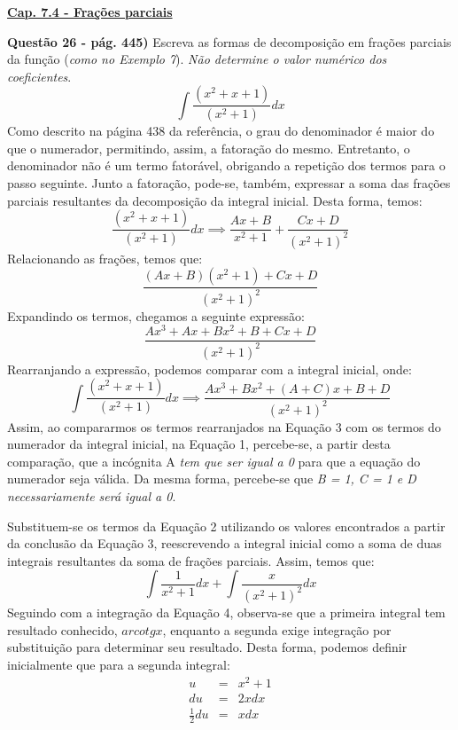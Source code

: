 \documentclass[12pt]{article}
\begin{document}
\noindent \underline{\textbf{Cap. 7.4 - Frações parciais}}\par
\noindent \textbf{Questão 26 - pág. 445)} Escreva as formas de decomposição em frações parciais da função (\textit{como no Exemplo 7}). \textit{Não determine o valor numérico dos coeficientes}.
\begin{equation}
    \int \frac{(x^2+x+1)}{(x^2+1)}dx \tag{1}
\end{equation}
Como descrito na página 438 da referência, o grau do denominador é maior do que o numerador, permitindo, assim, a fatoração do mesmo. Entretanto, o denominador não é um termo fatorável, obrigando a repetição dos termos para o passo seguinte. Junto a fatoração, pode-se, também, expressar a soma das frações parciais resultantes da decomposição da integral inicial. Desta forma, temos:
\begin{equation}
    \frac{(x^2+x+1)}{(x^2+1)}dx \implies \frac{Ax+B}{x^2+1} + \frac{Cx+D}{(x^2+1)^2}  \tag{2}
\end{equation}
Relacionando as frações, temos que:
\begin{equation}
    \frac{(Ax+B)(x^2+1)+Cx+D}{(x^2+1)^2} \nonumber
\end{equation}
Expandindo os termos, chegamos a seguinte expressão:
\begin{equation}
    \frac{Ax^3 + Ax + Bx^2 + B + Cx + D}{(x^2+1)^2} \nonumber
\end{equation}
Rearranjando a expressão, podemos comparar com a integral inicial, onde:
\begin{equation}
    \int \frac{(x^2+x+1)}{(x^2+1)}dx \implies \frac{Ax^3 + Bx^2 + (A+C)x + B + D}{(x^2+1)^2} \tag{3}
\end{equation}
Assim, ao compararmos os termos rearranjados na Equação 3 com os termos do numerador da integral inicial, na Equação 1, percebe-se, a partir desta comparação, que a incógnita A \emph{tem que ser igual a 0} para que a equação do numerador seja válida. Da mesma forma, percebe-se que \emph{B = 1, C = 1 e D necessariamente será igual a 0}.\par
Substituem-se os termos da Equação 2 utilizando os valores encontrados a partir da conclusão da Equação 3, reescrevendo a integral inicial como a soma de duas integrais resultantes da soma de frações parciais. Assim, temos que:
\begin{equation}
    \int \frac{1}{x^2+1}dx + \int \frac{x}{(x^2+1)^2}dx \tag{4}
\end{equation}
Seguindo com a integração da Equação 4, observa-se que a primeira integral tem resultado conhecido, $arcotg x$, enquanto a segunda exige integração por substituição para determinar seu resultado. Desta forma, podemos definir inicialmente que para a segunda integral:
\begin{eqnarray}
    u & = & x^2+1 \\ \nonumber
    du & = & 2xdx \\ \nonumber
    \frac{1}{2}du & = & xdx \\ \nonumber
\end{eqnarray}
\pagebreak
\end{document}
